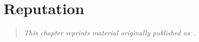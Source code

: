 \chapter{Reputation}
\label{ch:reputation}

\begin{quote}
\textit{This chapter reprints material originally
published as~\cite{Adler2007}.}
\end{quote}

\newcommand{\textmass}{\rho_t}
\newcommand{\editmass}{\rho_e}
\newcommand{\specq}{\alpha}
\newcommand{\especq}{\alpha_e}
\newcommand{\tspecq}{\alpha_t}
\newcommand{\repu}{{\text{\textit{rep}}}}
\def\eqpun{\;}
\newcommand{\prece}{{\text{\textit{prec}}}_e}
\newcommand{\prect}{{\text{\textit{prec}}}_t}
\newcommand{\recall}{{\text{\textit{rec}}}}
\newcommand{\recalle}{{\text{\textit{rec}}}_e}
\newcommand{\recallt}{{\text{\textit{rec}}}_t}
\newcommand{\boost}{{\text{\textit{boost}}}}
\newcommand{\booste}{{\text{\textit{boost}}}_e}
\newcommand{\boostt}{{\text{\textit{boost}}}_t}
\newcommand{\constraint}{\kappa}
\newcommand{\constrainte}{\kappa_e}
\newcommand{\constraintt}{\kappa_t}







%


